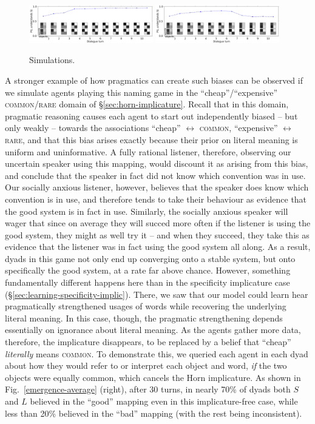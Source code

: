 \documentclass{article} %
\begin{document}
\begin{figure}[t]
\centering
\includegraphics[width=0.48\textwidth]{figures/horn-emergence-0.pdf}
\includegraphics[width=0.48\textwidth]{figures/horn-emergence-1.pdf}
\caption{\label{fig:horn} Simulations.}
\end{figure}

A stronger example of how pragmatics can create such biases can be observed if we simulate agents playing this naming game in the ``cheap''/``expensive'' \textsc{common}/\textsc{rare} domain of \S\ref{sec:horn-implicature}. Recall that in this domain, pragmatic reasoning causes each agent to start out independently biased -- but only weakly -- towards the associations ``cheap'' $\leftrightarrow$ \textsc{common}, ``expensive'' $\leftrightarrow$ \textsc{rare}, and that this bias arises exactly because their prior on literal meaning is uniform and uninformative. A fully rational listener, therefore, observing our uncertain speaker using this mapping, would discount it as arising from this bias, and conclude that the speaker in fact did not know which convention was in use. Our socially anxious listener, however, believes that the speaker does know which convention is in use, and therefore tends to take their behaviour as evidence that the good system is in fact in use. Similarly, the socially anxious speaker will wager that since on average they will succed more often if the listener is using the good system, they might as well try it -- and when they succeed, they take this as evidence that the listener was in fact using the good system all along. As a result, dyads in this game not only end up converging onto a stable system, but onto specifically the good system, at a rate far above chance. However, something fundamentally different happens here than in the specificity implicature case (\S\ref{sec:learning-specificity-implic}). There, we saw that our model could learn hear pragmatically strengthened usages of words while recovering the underlying literal meaning. In this case, though, the pragmatic strengthening depends essentially on ignorance about literal meaning. As the agents gather more data, therefore, the implicature disappears, to be replaced by a belief that ``cheap'' \textit{literally} means \textsc{common}. To demonstrate this, we queried each agent in each dyad about how they would refer to or interpret each object and word, \textit{if} the two objects were equally common, which cancels the Horn implicature. As shown in Fig.~\ref{emergence-average} (right), after 30 turns, in nearly 70\% of dyads both $S$ and $L$ believed in the ``good'' mapping even in this implicature-free case, while less than 20\% believed in the ``bad'' mapping (with the rest being inconsistent).
\end{document}
